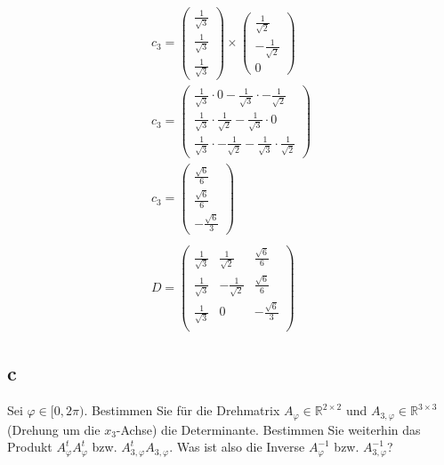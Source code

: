 \begin{align*}
    c_3 = \begin{pmatrix}
              \frac{1}{\sqrt{3}} \\
              \frac{1}{\sqrt{3}} \\
              \frac{1}{\sqrt{3}}
          \end{pmatrix} \times \begin{pmatrix}
                                   \frac{1}{\sqrt{2}} \\ -\frac{1}{\sqrt{2}} \\ 0
                               \end{pmatrix}                                                    \\
    c_3 = \begin{pmatrix}
              \frac{1}{\sqrt{3}} \cdot 0 - \frac{1}{\sqrt{3}} \cdot -\frac{1}{\sqrt{2}} \\
              \frac{1}{\sqrt{3}} \cdot \frac{1}{\sqrt{2}} - \frac{1}{\sqrt{3}} \cdot 0  \\
              \frac{1}{\sqrt{3}} \cdot -\frac{1}{\sqrt{2}} - \frac{1}{\sqrt{3}} \cdot \frac{1}{\sqrt{2}}
          \end{pmatrix} \\
    c_3 = \begin{pmatrix}
              \frac{\sqrt{6}}{6} \\ \frac{\sqrt{6}}{6} \\ -\frac{\sqrt{6}}{3}
          \end{pmatrix}                                          \\\\D = \begin{pmatrix}
        \frac{1}{\sqrt{3}} & \frac{1}{\sqrt{2}}  & \frac{\sqrt{6}}{6}  \\
        \frac{1}{\sqrt{3}} & -\frac{1}{\sqrt{2}} & \frac{\sqrt{6}}{6}  \\
        \frac{1}{\sqrt{3}} & 0                   & -\frac{\sqrt{6}}{3} \\
    \end{pmatrix}
\end{align*}

\subsection{c}

Sei $\varphi \in [0, 2\pi)$. Bestimmen Sie für die Drehmatrix $A_\varphi \in
    \mathbb{R}^{2 \times 2}$ und $A_{3, \varphi} \in \mathbb{R}^{3 \times 3}$
(Drehung um die $x_3$-Achse) die Determinante. Bestimmen Sie weiterhin das
Produkt $A^t_\varphi A^t_\varphi$ bzw. $A^t_{3, \varphi} A_{3, \varphi}$. Was
ist also die Inverse $A^{-1}_{\varphi}$ bzw. $A^{-1}_{3, \varphi}$?

